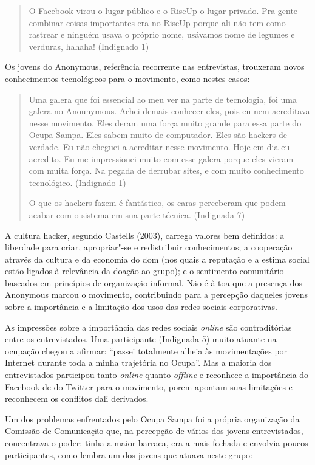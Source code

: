 \begin{quote}
O Facebook virou o lugar público e o RiseUp o lugar privado. Pra gente
combinar coisas importantes era no RiseUp porque ali não tem como
rastrear e ninguém usava o próprio nome, usávamos nome de legumes e
verduras, hahaha! (Indignado 1)
\end{quote}

Os jovens do Anonymous, referência recorrente nas entrevistas, trouxeram
novos conhecimentos tecnológicos para o movimento, como nestes casos:

\begin{quote}
Uma galera que foi essencial ao meu ver na parte de tecnologia, foi uma
galera no Anounymous. Achei demais conhecer eles, pois eu nem acreditava
nesse movimento. Eles deram uma força muito grande para essa parte do
Ocupa Sampa. Eles sabem muito de computador. Eles são hackers de
verdade. Eu não cheguei a acreditar nesse movimento. Hoje em dia eu
acredito. Eu me impressionei muito com esse galera porque eles vieram
com muita força. Na pegada de derrubar sites, e com muito conhecimento
tecnológico. (Indignado 1)

O que os hackers fazem é fantástico, os caras perceberam que podem
acabar com o sistema em sua parte técnica. (Indignada 7)
\end{quote}

A cultura hacker, segundo Castells (2003), carrega valores bem
definidos: a liberdade para criar, apropriar"-se e redistribuir
conhecimentos; a cooperação através da cultura e da economia do dom (nos
quais a reputação e a estima social estão ligados à relevância da doação
ao grupo); e o sentimento comunitário baseados em princípios de
organização informal. Não é à toa que a presença dos Anonymous marcou o
movimento, contribuindo para a percepção daqueles jovens sobre a
importância e a limitação dos usos das redes sociais corporativas.

As impressões sobre a importância das redes sociais \emph{online} são
contraditórias entre os entrevistados. Uma participante (Indignada
5) muito atuante na ocupação chegou a afirmar: ``passei totalmente
alheia às movimentações por Internet durante toda a minha trajetória no
Ocupa''. Mas a maioria dos entrevistados participou tanto
\emph{online} quanto \emph{offline} e reconhece a importância do
Facebook de do Twitter para o movimento, porem apontam suas limitações e
reconhecem os conflitos dali derivados.

Um dos problemas enfrentados pelo Ocupa Sampa foi a própria organização
da Comissão de Comunicação que, na percepção de vários dos jovens
entrevistados, concentrava o poder: tinha a maior barraca, era a mais
fechada e envolvia poucos participantes, como lembra um dos jovens
que atuava neste grupo:

